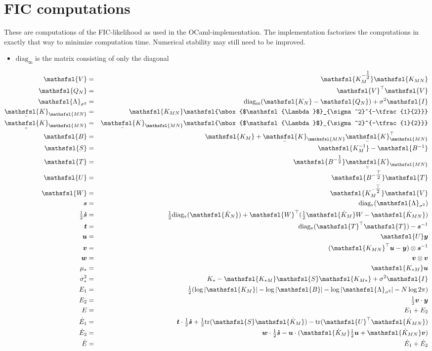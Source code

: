 \documentclass[12pt]{article}
\newcommand{\myu}[1]{\underaccent{\bar}{#1}}
\newcommand{\onehalf}{\tfrac{1}{2}}
\newcommand{\mat}[1]{\mbox{$\mathsfsl{#1}$}}
\renewcommand{\vec}[1]{\mbox{\boldmath$#1$}}
\newcommand{\diagv}[1]{\mathrm{diag_v}(#1)}
\newcommand{\diagm}[1]{\mathrm{diag_m}(#1)}
\newcommand{\trace}[1]{\mathrm{tr}(#1)}
\newcommand{\transm}[1]{\mat{#1}^\top}
\newcommand{\imat}[1]{\mat{#1^{-1}}}
\newcommand{\ichol}[1]{\mat{#1^{-\onehalf}}}
\newcommand{\icholt}[1]{\mat{#1^{-\tfrac{\top}{2}}}}
\newcommand{\Km}{\mat{K_M}}
\newcommand{\dKm}{\mat{\dot{K}_M}}
\newcommand{\dkn}{\mat{\dot{K}_N}}
\newcommand{\Kmn}{\mat{K_{MN}}}
\newcommand{\Knm}{\transm{K_{MN}}}
\newcommand{\uKnm}{\myu{\mat{K}}_{\mathsfsl{MN}}^\top}
\newcommand{\dKmn}{\mat{\dot{K}_{MN}}}
\newcommand{\uKmn}{\myu{\mat{K}}_{\mathsfsl{MN}}}
\newcommand{\uuKmn}{\myu{\myu{\mat{K}}}_{\mathsfsl{MN}}}
\newcommand{\dE}{\dot{E}}
\newcommand{\vecs}{\vec{s}}
\newcommand{\vect}{\vec{t}}
\newcommand{\vecu}{\vec{u}}
\newcommand{\vecv}{\vec{v}}
\newcommand{\vecw}{\vec{w}}
\newcommand{\vecy}{\vec{y}}
\newcommand{\vecsdh}{\onehalf\vec{\dot{s}}}
\newcommand{\vecis}{\vec{s}^{-1}}
\newcommand{\matB}{\mat{B}}
\newcommand{\matI}{\mat{I}}
\newcommand{\matS}{\mat{S}}
\newcommand{\matT}{\mat{T}}
\newcommand{\matU}{\mat{U}}
\newcommand{\matV}{\mat{V}}
\newcommand{\matW}{\mat{W}}
\newcommand{\Lamss}{\mat{\Lambda}_{\sigma^2}}
\begin{document}
\section{FIC computations}

These are computations of the FIC-likelihood as used in the
OCaml-implementation.  The implementation factorizes the computations
in exactly that way to minimize computation time.  Numerical stability
may still need to be improved.

\begin{itemize}
\item $\mathrm{diag_m}$ is the matrix consisting of only the diagonal
\end{itemize}

\begin{eqnarray*}
\matV & = & \ichol{K_M}\Kmn \\
\mat{Q_N} & = & \transm{V} \matV \\
\Lamss & = & \diagm{\mat{K_N} - \mat{Q_N}} + \sigma^2 \matI \\
\uKmn & = & \Kmn \ichol{\Lamss} \\
\uuKmn & = & \uKmn\ichol{\Lamss} \\
\matB & = & \Km + \uKmn\uKnm \\
\matS & = & \imat{K_M} - \imat{B} \\
\matT & = & \ichol{B}\uuKmn \\
\matU & = & \icholt{B}\matT \\
\matW & = & \icholt{K_M}\mat{V} \\
\vecs & = & \diagv{\Lamss} \\
\vecsdh & = & \onehalf\diagv{\dkn} + \transm{W}(\onehalf\dKm W - \dKmn) \\
\vect & = & \diagv{\transm{T}\matT} - \vecis \\
\vecu & = & \matU \vecy \\
\vecv & = & (\Knm \vecu - \vecy) \otimes \vecis \\
\vecw & = & \vecv \otimes \vecv \\
\mu_* & = & \mat{K_{*M}} \vecu \\
\sigma^2_* & = & K_* - \mat{K_{*M}}\matS\mat{K_{M*}} + \sigma^2 \matI \\
E_1 & = & \onehalf (\log|\Km| - \log|\matB| - \log|\Lamss| - N \log 2\pi) \\
E_2 & = & \onehalf \vecv\cdot\vecy \\
E & = & E_1 + E_2 \\
\dE_1 & = & \vect\cdot\vecsdh + \onehalf\trace{\matS\dKm} - \trace{\transm{U}\dKmn} \\
\dE_2 & = & \vecw\cdot\vecsdh - \vecu\cdot(\dKm \onehalf \vecu + \dKmn \vecv) \\
\dE & = & \dE_1 + \dE_2 \\
\end{eqnarray*}
\end{document}
